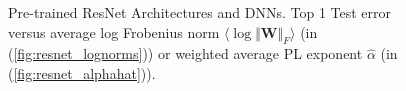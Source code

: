 \begin{figure}[!htb]
   \centering
   \caption{
      Pre-trained
      ResNet Architectures and DNNs.  
      Top 1 Test error versus
      average log Frobenius norm $\langle\log\Vert\mathbf{W}\Vert_{F}\rangle$ (in (\ref{fig:resnet_lognorms}))
      or
      weighted average PL exponent $\hat{\alpha}$ (in (\ref{fig:resnet_alphahat})).
           }
   \label{fig:resnet}
\end{figure}

